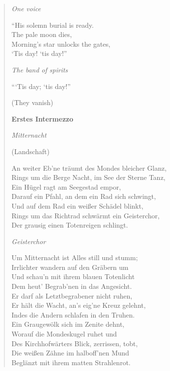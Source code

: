 \begin{verse}
\smallskip

\textit{One voice}

\smallskip

``His solemn burial is ready. \\
The pale moon dies, \\
Morning’s star unlocks the gates, \\
‘Tis day! ‘tis day!”

\smallskip

\textit{The band of spirits}

\smallskip

``‘Tis day; ‘tis day!”

\smallskip

(They vanish)

\smallskip


\bigskip

\textbf{Erstes Intermezzo}

\smallskip

\textit{Mitternacht}

\smallskip

(Landschaft)

\smallskip

An weiter Eb’ne träumt des Mondes bleicher Glanz, \\
Rings um die Berge Nacht, im See der Sterne Tanz, \\
Ein Hügel ragt am Seegestad empor, \\
Darauf ein Pfahl, an dem ein Rad sich schwingt, \\
Und auf dem Rad ein weißer Schädel blinkt, \\
Rings um das Richtrad schwärmt ein Geisterchor, \\
Der grausig einen Totenreigen schlingt.

\smallskip

\textit{Geisterchor}

\smallskip

Um Mitternacht ist Alles still und stumm; \\
Irrlichter wandern auf den Gräbern um \\
Und schau’n mit ihrem blauen Totenlicht \\
Dem heut’ Begrab’nen in das Angesicht. \\
Er darf als Letztbegrabener nicht ruhen, \\
Er hält die Wacht, an’s eig’ne Kreuz gelehnt, \\
Indes die Andern schlafen in den Truhen. \\
Ein Graugewölk sich im Zenite dehnt, \\
Worauf die Mondeskugel ruhet und \\
Des Kirchhofwärters Blick, zerrissen, tobt, \\
Die weißen Zähne im halboff’nen Mund \\
Beglänzt mit ihrem matten Strahlenrot.


\end{verse}
